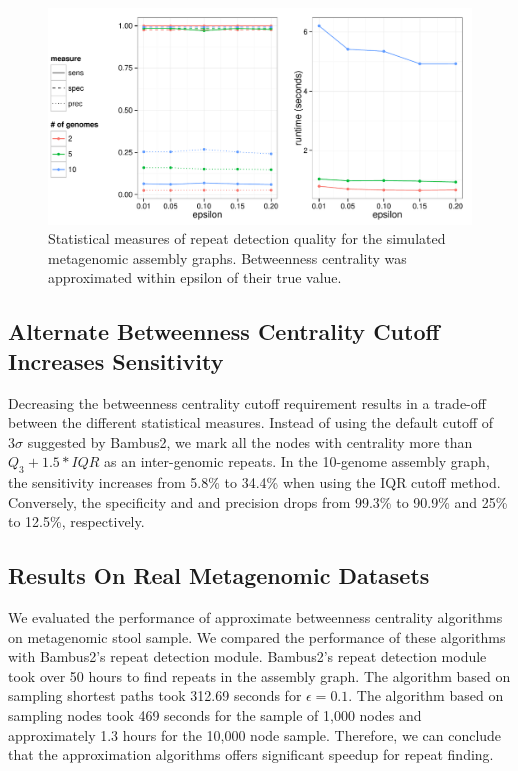 \documentclass[runningheads,a4paper]{llncs}
\begin{document}
\begin{figure}[htbp]
\centering
\includegraphics[width = \textwidth]{sampled_paths}
\caption{Statistical measures of repeat detection quality for the simulated metagenomic assembly graphs. Betweenness centrality was approximated within epsilon of their true value.}
\label{fig:sampled_paths}
\end{figure}

\subsection*{Alternate Betweenness Centrality Cutoff Increases Sensitivity}

Decreasing the betweenness centrality cutoff requirement results in a trade-off between the different statistical measures.
Instead of using the default cutoff of $3\sigma$ suggested by Bambus2, we mark all the nodes with centrality more than $Q_{3} + 1.5*IQR$ as an inter-genomic repeats.
In the 10-genome assembly graph, the sensitivity increases from 5.8\% to 34.4\% when using the IQR cutoff method.
Conversely, the specificity and and precision drops from 99.3\% to 90.9\% and 25\% to 12.5\%, respectively.


\subsection*{Results On Real Metagenomic Datasets}
We evaluated the performance of approximate betweenness centrality algorithms on metagenomic stool sample.
We compared the performance of these algorithms with Bambus2's repeat detection module.
Bambus2's repeat detection module took over 50 hours to find repeats in the assembly graph.
The algorithm based on sampling shortest paths took 312.69 seconds for $\epsilon = 0.1$.
The algorithm based on sampling nodes took 469 seconds for the sample of 1,000 nodes and approximately 1.3 hours for the 10,000 node sample. Therefore, we can conclude that the approximation algorithms offers significant speedup for repeat finding.  
\end{document}

